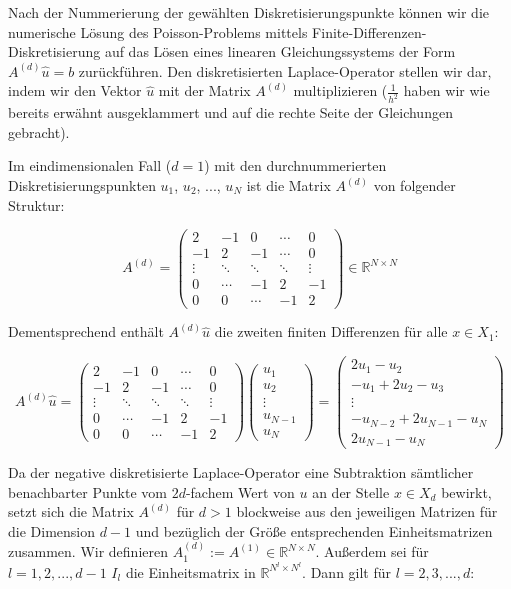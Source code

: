 \documentclass{scrartcl}
\newcommand{\R}{\mathbb{R}}
\begin{document}
Nach der Nummerierung der gewählten Diskretisierungspunkte können wir die numerische Lösung des Poisson-Problems mittels Finite-Differenzen-Diskretisierung auf das Lösen eines linearen Gleichungssystems der Form $A^{(d)}\hat{u}=b$ zurückführen.
Den diskretisierten Laplace-Operator stellen wir dar, indem wir den Vektor $\hat{u}$ mit der Matrix $A^{(d)}$ multiplizieren ($\frac{1}{h^2}$ haben wir wie bereits erwähnt ausgeklammert und auf die rechte Seite der Gleichungen gebracht).

Im eindimensionalen Fall ($d=1$) mit den durchnummerierten Diskretisierungspunkten $u_1$, $u_2$, ..., $u_N$ ist die Matrix $A^{(d)}$ von folgender Struktur:

\[A^{(d)}=
\begin{pmatrix}
   2 & -1 &  0 & \cdots & 0 \\
  -1 &  2 & -1 & \cdots & 0 \\
   \vdots & \ddots & \ddots & \ddots & \vdots \\
   0 & \cdots & -1 &  2 & -1 \\
   0 & 0 & \cdots & -1 &  2
\end{pmatrix}
\in\R^{N\times N}
\]


Dementsprechend enthält $A^{(d)}\hat{u}$ die zweiten finiten Differenzen für alle $x \in X_1$:

\[A^{(d)}\hat{u}=
\begin{pmatrix}
   2 & -1 &  0 & \cdots & 0 \\
  -1 &  2 & -1 & \cdots & 0 \\
   \vdots & \ddots & \ddots & \ddots & \vdots \\
   0 & \cdots & -1 &  2 & -1 \\
   0 & 0 & \cdots & -1 &  2
\end{pmatrix}
\begin{pmatrix}
  u_1\\
  u_2\\
  \vdots\\
  u_{N-1}\\
  u_N
\end{pmatrix}
=
\begin{pmatrix}
  2u_1-u_2\\
  -u_1+2u_2-u_3\\
  \vdots\\
  -u_{N-2}+2u_{N-1}-u_N\\
  2u_{N-1}-u_N
\end{pmatrix}
\]


Da der negative diskretisierte Laplace-Operator eine Subtraktion sämtlicher benachbarter Punkte vom $2d$-fachem Wert von $u$ an der Stelle $x \in X_d$ bewirkt, setzt sich die Matrix $A^{(d)}$ für $d > 1$ blockweise aus den jeweiligen Matrizen für die Dimension $d-1$ und bezüglich der Größe entsprechenden Einheitsmatrizen zusammen. Wir definieren $A^{(d)}_1 := A^{(1)} \in \R^{N\times N}$. Außerdem sei für $l = 1, 2, ..., d-1$ $I_l$ die Einheitsmatrix in $\R^{N^l \times N^l}$. Dann gilt für $l = 2, 3, ..., d$:
\end{document}
